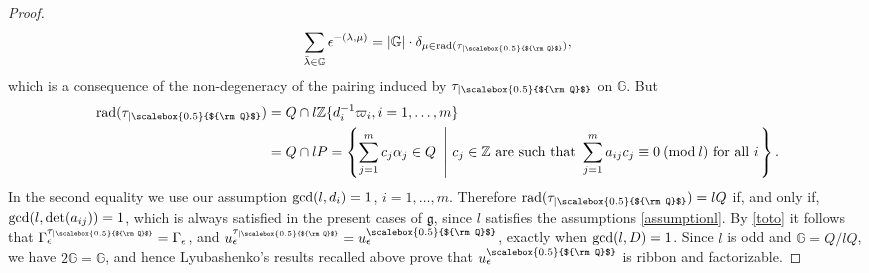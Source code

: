 \documentclass[11pt]{amsart}
\newcommand{\e}{\epsilon}
\newcommand{\mz}{\mathbb{Z}}
\newcommand{\Q}{{\scalebox{0.5}{${\rm Q}$}}}
\begin{document}
\begin{proof}
$$\sum_{\bar{\lambda}\in \mathbb{G}} \e^{-(\lambda,\mu)}  = \vert \mathbb{G} \vert \cdot \delta_{\mu\in {\rm rad}(\tau_{\vert \Q})},$$
which is a consequence of the non-degeneracy of the pairing induced by ${\tau_{\vert \Q}}$ on $\mathbb{G}$. But
\begin{align*}
{\rm rad}(\tau_{\vert \Q}) & = Q\cap l\mz\{d_i^{-1}\varpi_i, i=1,\ldots,m\} \\ & = Q\cap lP = \left\lbrace\sum_{j=1}^m c_j\alpha_j\in Q\ \left\vert \ c_j\in \mz \text{ are such that }\sum_{j=1}^m a_{ij}c_j \equiv 0 \: (\mathrm{mod} \: l) \text{ for all } i\right.\right\rbrace .
\end{align*}
In the second equality we use our assumption ${\rm gcd}(l,d_i)=1$, $i=1,\ldots,m$. Therefore ${\rm rad}(\tau_{\vert \Q})=lQ$ if, and only if, ${\rm gcd}(l,{\rm det}(a_{ij})) =1$, which is always satisfied in the present cases of $\mathfrak{g}$, since $l$ satisfies the assumptions \eqref{assumptionl}. By \eqref{toto} it follows that $\Gamma_\e^{\tau_{\vert \Q}}=\Gamma_\e$, and $u_\e^{\tau_{\vert \Q}} = u_\e^\Q$, exactly when ${\rm gcd}(l,D)=1$. Since $l$ is odd and $\mathbb{G} = Q/lQ$, we have $2\mathbb{G} = \mathbb{G}$, and hence Lyubashenko's results recalled above prove that $u_\e^\Q$ is ribbon and factorizable.


\end{proof}
\end{document}
